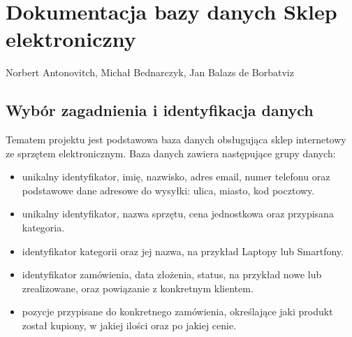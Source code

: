 \documentclass[letterpaper,10pt,polish]{sphinxmanual}
\begin{document}
\sphinxstepscope


\chapter{Dokumentacja bazy danych \textendash{} Sklep elektroniczny}
\label{\detokenize{rozdzial_3/index:dokumentacja-bazy-danych-sklep-elektroniczny}}\label{\detokenize{rozdzial_3/index::doc}}
\sphinxAtStartPar
{} Norbert Antonovitch, Michał Bednarczyk, Jan Balazs de Borbatviz


\section{Wybór zagadnienia i identyfikacja danych}
\label{\detokenize{rozdzial_3/index:wybor-zagadnienia-i-identyfikacja-danych}}
\sphinxAtStartPar
Tematem projektu jest podstawowa baza danych obsługująca sklep internetowy ze sprzętem elektronicznym.
Baza danych zawiera następujące grupy danych:
\begin{itemize}
\item {} 
\sphinxAtStartPar
{} unikalny identyfikator, imię, nazwisko, adres e\sphinxhyphen{}mail, numer telefonu oraz podstawowe dane adresowe do wysyłki: ulica, miasto, kod pocztowy.

\item {} 
\sphinxAtStartPar
{} unikalny identyfikator, nazwa sprzętu, cena jednostkowa oraz przypisana kategoria.

\item {} 
\sphinxAtStartPar
{} identyfikator kategorii oraz jej nazwa, na przykład Laptopy lub Smartfony.

\item {} 
\sphinxAtStartPar
{} identyfikator zamówienia, data złożenia, status, na przykład nowe lub zrealizowane, oraz powiązanie z konkretnym klientem.

\item {} 
\sphinxAtStartPar
{} pozycje przypisane do konkretnego zamówienia, określające jaki produkt został kupiony, w jakiej ilości oraz po jakiej cenie.

\end{itemize}
\end{document}
